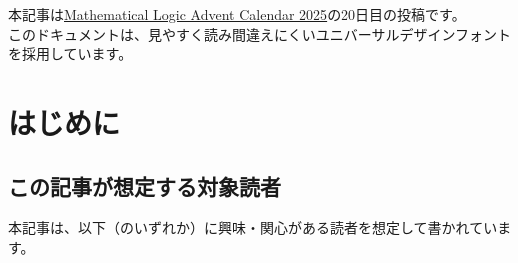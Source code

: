 \documentclass[
		head_space=20mm,
		foot_space=20mm,
		gutter=10mm,
		line_length=190mm
]{jlreq}
\begin{document}
\maketitle %


\begin{screen}
	\begin{center}
		本記事は\href{https://adventar.org/calendars/11397}{Mathematical Logic Advent Calendar 2025}の20日目の投稿です。
		\\
		このドキュメントは、見やすく読み間違えにくいユニバーサルデザインフォントを採用しています。
	\end{center}


\end{screen}

\vspace{3mm}

\tableofcontents %


\setcounter{section}{-1}


\clearpage


\section{はじめに}



\subsection*{この記事が想定する対象読者}

\noindent 本記事は、以下（のいずれか）に興味・関心がある読者を想定して書かれています。
\end{document}
